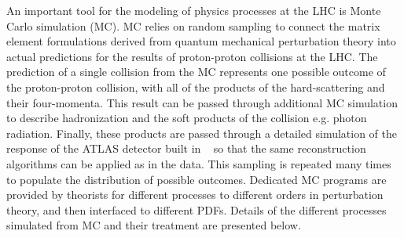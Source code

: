 An important tool for the modeling of physics processes
at the LHC is Monte Carlo simulation (MC).
MC relies on random sampling to connect the matrix element formulations
derived from quantum mechanical perturbation theory into 
actual predictions for the results of proton-proton collisions
at the LHC.
The prediction of a single collision from the MC represents
one possible outcome of the proton-proton collision, with all of the 
products of the hard-scattering and their four-momenta.
This result can be passed through additional MC simulation to describe
hadronization and the soft products of the collision e.g. photon radiation.
Finally, these products are passed through a detailed 
simulation of the response of the 
ATLAS detector built in \geant~\cite{Agostinelli:2002hh}
so that the same reconstruction algorithms
can be applied as in the data.
This sampling is repeated many times to populate the 
distribution of possible
outcomes. Dedicated MC programs are provided by theorists for 
different processes to different orders in perturbation theory,
and then interfaced to different PDFs.
Details of the different processes simulated from MC and their
treatment are presented below.





\newpage




